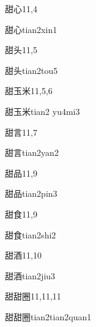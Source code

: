 \begin{entry}{甜心}{11,4}
  \begin{phonetics}{甜心}{tian2xin1}
  \end{phonetics}
\end{entry}

\begin{entry}{甜头}{11,5}
  \begin{phonetics}{甜头}{tian2tou5}
  \end{phonetics}
\end{entry}

\begin{entry}{甜玉米}{11,5,6}
  \begin{phonetics}{甜玉米}{tian2 yu4mi3}
  \end{phonetics}
\end{entry}

\begin{entry}{甜言}{11,7}
  \begin{phonetics}{甜言}{tian2yan2}
  \end{phonetics}
\end{entry}

\begin{entry}{甜品}{11,9}
  \begin{phonetics}{甜品}{tian2pin3}
  \end{phonetics}
\end{entry}

\begin{entry}{甜食}{11,9}
  \begin{phonetics}{甜食}{tian2shi2}
  \end{phonetics}
\end{entry}

\begin{entry}{甜酒}{11,10}
  \begin{phonetics}{甜酒}{tian2jiu3}
  \end{phonetics}
\end{entry}

\begin{entry}{甜甜圈}{11,11,11}
  \begin{phonetics}{甜甜圈}{tian2tian2quan1}
  \end{phonetics}
\end{entry}

